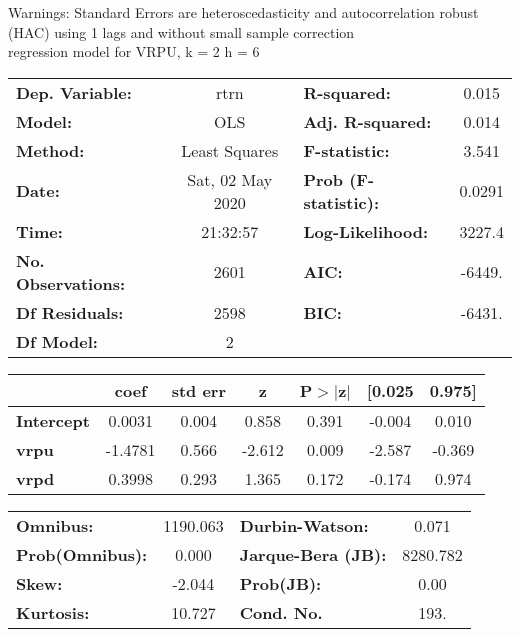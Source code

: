Warnings: \newline
 [1] Standard Errors are heteroscedasticity and autocorrelation robust (HAC) using 1 lags and without small sample correction\\ 

regression model for VRPU, k = 2 h = 6\begin{center}
\begin{tabular}{lclc}
\toprule
\textbf{Dep. Variable:}    &       rtrn       & \textbf{  R-squared:         } &     0.015   \\
\textbf{Model:}            &       OLS        & \textbf{  Adj. R-squared:    } &     0.014   \\
\textbf{Method:}           &  Least Squares   & \textbf{  F-statistic:       } &     3.541   \\
\textbf{Date:}             & Sat, 02 May 2020 & \textbf{  Prob (F-statistic):} &   0.0291    \\
\textbf{Time:}             &     21:32:57     & \textbf{  Log-Likelihood:    } &    3227.4   \\
\textbf{No. Observations:} &        2601      & \textbf{  AIC:               } &    -6449.   \\
\textbf{Df Residuals:}     &        2598      & \textbf{  BIC:               } &    -6431.   \\
\textbf{Df Model:}         &           2      & \textbf{                     } &             \\
\bottomrule
\end{tabular}
\begin{tabular}{lcccccc}
                   & \textbf{coef} & \textbf{std err} & \textbf{z} & \textbf{P$> |$z$|$} & \textbf{[0.025} & \textbf{0.975]}  \\
\midrule
\textbf{Intercept} &       0.0031  &        0.004     &     0.858  &         0.391        &       -0.004    &        0.010     \\
\textbf{vrpu}      &      -1.4781  &        0.566     &    -2.612  &         0.009        &       -2.587    &       -0.369     \\
\textbf{vrpd}      &       0.3998  &        0.293     &     1.365  &         0.172        &       -0.174    &        0.974     \\
\bottomrule
\end{tabular}
\begin{tabular}{lclc}
\textbf{Omnibus:}       & 1190.063 & \textbf{  Durbin-Watson:     } &    0.071  \\
\textbf{Prob(Omnibus):} &   0.000  & \textbf{  Jarque-Bera (JB):  } & 8280.782  \\
\textbf{Skew:}          &  -2.044  & \textbf{  Prob(JB):          } &     0.00  \\
\textbf{Kurtosis:}      &  10.727  & \textbf{  Cond. No.          } &     193.  \\
\bottomrule
\end{tabular}
\end{center}

